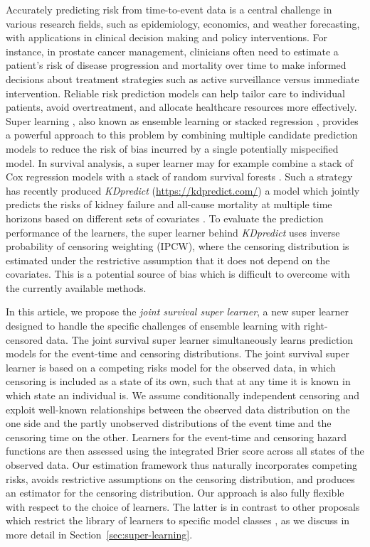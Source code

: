 \documentclass[alpha-refs]{wiley-article}
\newcommand{\1}{\mathbb{1}}
\begin{document}
Accurately predicting risk from time-to-event data is a central
challenge in various research fields, such as epidemiology, economics,
and weather forecasting, with applications in clinical decision making
and policy interventions. For instance, in prostate cancer management,
clinicians often need to estimate a patient’s risk of disease
progression and mortality over time to make informed decisions about
treatment strategies such as active surveillance versus immediate
intervention. Reliable risk prediction models can help tailor care to
individual patients, avoid overtreatment, and allocate healthcare
resources more effectively. Super learning \citep{van2007super}, also
known as ensemble learning or stacked regression
\citep{wolpert1992stacked,breiman1996stacked}, provides a powerful
approach to this problem by combining multiple candidate prediction
models to reduce the risk of bias incurred by a single potentially
mispecified model. In survival analysis, a super learner may for
example combine a stack of Cox regression models with a stack of
random survival forests \citep[][Section 8.4]{gerds2021medical}. Such
a strategy has recently produced \textit{KDpredict}
(\url{https://kdpredict.com/}) a model which jointly predicts the
risks of kidney failure and all-cause mortality at multiple time
horizons based on different sets of covariates
\citep{liu2024predicting}. To evaluate the prediction performance of
the learners, the super learner behind \textit{KDpredict} uses inverse
probability of censoring weighting (IPCW), where the censoring
distribution is estimated under the restrictive assumption that it
does not depend on the covariates. This is a potential source of bias
which is difficult to overcome with the currently available methods.

In this article, we propose the {\it joint survival super learner}, a
new super learner designed to handle the specific challenges of
ensemble learning with right-censored data. The joint survival super
learner simultaneously learns prediction models for the event-time and
censoring distributions. The joint survival super learner is based on
a competing risks model for the observed data, in which censoring is
included as a state of its own, such that at any time it is known in
which state an individual is. We assume conditionally independent
censoring and exploit well-known relationships between the observed
data distribution on the one side and the partly unobserved
distributions of the event time and the censoring time on the
other. Learners for the event-time and censoring hazard functions are
then assessed using the integrated Brier score across all states of
the observed data. Our estimation framework thus naturally
incorporates competing risks, avoids restrictive assumptions on the
censoring distribution, and produces an estimator for the censoring
distribution. Our approach is also fully flexible with respect to the
choice of learners. The latter is in contrast to other proposals which
restrict the library of learners to specific model classes
\citep{polley2011-sl-cens,golmakani2020super}, as we discuss in more
detail in Section~\ref{sec:super-learning}.
\end{document}
